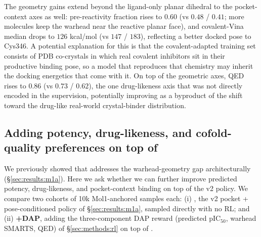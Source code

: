 The geometry gains extend beyond the ligand-only planar dihedral to the pocket-context axes as well: pre-reactivity fraction rises to $0.60$ (vs $0.48$ / $0.41$; more molecules keep the warhead near the reactive planar face), and covalent-Vina median drops to $126$ kcal/mol (vs $147$ / $183$), reflecting a better docked pose to Cys346. A potential explanation for this is that the covalent-adapted training set consists of PDB co-crystals in which real covalent inhibitors sit in their productive binding pose, so a model that reproduces that chemistry may inherit the docking energetics that come with it. On top of the geometric axes, QED rises to $0.86$ (vs $0.73$ / $0.62$), the one drug-likeness axis that was not directly encoded in the supervision, potentially improving as a byproduct of the shift toward the drug-like real-world crystal-binder distribution.


\subsection{Adding potency, drug-likeness, and cofold-quality preferences on top of \Cvcond{}}
\label{sec:results:covdpo}

We previously showed that \Cvcond{} addresses the warhead-geometry gap architecturally (\S\ref{sec:results:m1a}). Here we ask whether we can further improve predicted potency, drug-likeness, and pocket-context binding on top of the v2 policy. We compare two cohorts of 10k Mol1-anchored samples each: (i) \textbf{\Cvcond{}}, the v2 pocket + pose-conditioned policy of \S\ref{sec:results:m1a}, sampled directly with no RL; and (ii) \textbf{\Cvcond{}+DAP}, adding the three-component DAP reward (predicted pIC$_{50}$, warhead SMARTS, QED) of \S\ref{sec:methods:rl} on top of \Cvcond{}.

